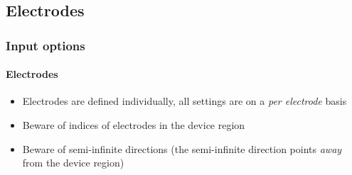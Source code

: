 
\subsection{Electrodes}

\begin{frame}
  \frametitle{Input options}
  \framesubtitle{Electrodes}

  \begin{itemize}
    \item Electrodes are defined individually, all settings are on a \emph{per electrode} basis
    \item Beware of indices of electrodes in the device region
    \item Beware of semi-infinite directions (the semi-infinite direction points
    \emph{away} from the device region)

  \end{itemize}

\end{frame}

